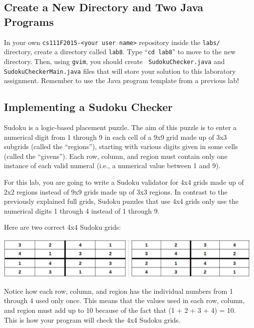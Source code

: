 \vspace{-0.1in}
\subsection*{Create a New Directory and Two Java Programs}
\vspace{-0.05in}

In your own {\tt cs111F2015-<your user name>} repository inside the {\tt labs/} directory, create a directory called
{\tt lab8}. Type ``{\tt cd lab8}'' to move to the new directory. Then, using {\tt gvim}, you should create {\tt
  SudokuChecker.java} and {\tt SudokuCheckerMain.java} files that will store your solution to this laboratory
assignment. Remember to use the Java program template from a previous lab!

\vspace{-0.1in}
\subsection*{Implementing a Sudoku Checker}
\vspace{-0.05in}

Sudoku is a logic-based placement puzzle. The aim of this puzzle is to enter a numerical digit from 1 through 9 in each
cell of a 9x9 grid made up of 3x3 subgrids (called the ``regions''), starting with various digits given in some cells
(called the ``givens''). Each row, column, and region must contain only one instance of each valid numeral (i.e., a
numerical value between 1 and 9).

\noindent For this lab, you are going to write a Sudoku validator for 4x4 grids made up of 2x2 regions instead of 9x9
grids made up of 3x3 regions.  In contrast to the previously explained full grids, Sudoku puzzles that use 4x4 grids
only use the numerical digits 1 through 4 instead of 1 through 9.

\noindent Here are two correct 4x4 Sudoku grids:

\vspace*{.01in}
\includegraphics[scale=0.3]{grids}

\noindent Notice how each row, column, and region has the individual numbers from 1 through 4 used only once.  This means
that the values used in each row, column, and region must add up to 10 because of the fact that (1 + 2 + 3 + 4) = 10.  This is
how your program will check the 4x4 Sudoku grids.

